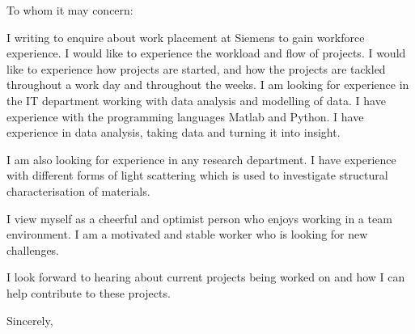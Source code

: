 \documentclass[10pt,a4paper]{letter}
\begin{document}
\begin{letter}{}
\opening{To whom it may concern:}

I writing to enquire about work placement at Siemens to gain workforce experience. I would like to experience the workload and flow of projects. I would like to experience how projects are started, and how the projects are tackled throughout a work day and throughout the weeks. I am looking for experience in the IT department working with data analysis and modelling of data. I have experience with the programming languages Matlab and Python. I have experience in data analysis, taking data and turning it into insight. 

I am also looking for experience in any research department. I have experience with different forms of light scattering which is used to investigate structural characterisation of materials.

I view myself as a cheerful and optimist person who enjoys working in a team environment. I am a motivated and stable worker who is looking for new challenges. 

I look forward to hearing about current projects being worked on and how I can help contribute to these projects.

\closing{Sincerely,}

\end{letter}

\end{document}
